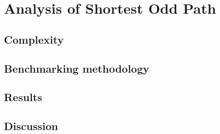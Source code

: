 \chapter{Analysis of Shortest Odd Path}

\section{Complexity}

\section{Benchmarking methodology}

\section{Results}

\section{Discussion}